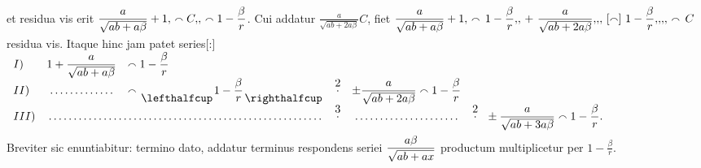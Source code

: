 \pend
\count{}
\count{}
\pstart
\noindent
et residua vis erit $\displaystyle \rule[-4mm]{0mm}{10mm} \frac{a}{\sqrt{ab + a \beta}} + 1, \, \smallfrown C,\!, \, \smallfrown 1 - \frac{\beta}{r}$.
Cui addatur $\displaystyle \frac{a}{\sqrt{ab + 2a \beta}} C$,
fiet $\displaystyle \frac{a}{\sqrt{ab + a \beta}} + 1, \, \smallfrown \, 1 - \rule[-4mm]{0mm}{10mm} \frac{\beta}{r},\!, \, + \ \frac{a}{\sqrt{ab + 2a \beta}},\!,\!, \, [\smallfrown] \ 1 - \frac{\beta}{r},\!,\!,\!, \, \smallfrown \, C$ residua vis.
Itaque hinc jam patet series[:]
$\begin{array}{llllll}
I) 
& {\displaystyle 1 + \frac{a}{\sqrt{ab + a \beta}}} 
& {\displaystyle \smallfrown 1 - \frac{\beta}{r}}
\\
II) 
& \multicolumn{1}{c}{\displaystyle \dotfill}
& {\displaystyle \smallfrown {\atop \lefthalfcup} 1 - \frac{\beta}{r} {\atop \righthalfcup}}
& \overset{\displaystyle 2}{\displaystyle \cdot}
& {\displaystyle \pm  \frac{a}{\sqrt{ab + 2a \beta}} \smallfrown 1 - \frac{\beta}{r}}
\\
III) 
& \multicolumn{2}{c}{\displaystyle \dotfill} 
& \overset{\displaystyle 3}{\displaystyle \cdot}
& \multicolumn{1}{c}{\displaystyle \dotfill} 
& {\displaystyle \overset{\displaystyle 2}{\displaystyle \cdot} \ \ \pm \frac{a}{\sqrt{ab + 3a \beta}} \smallfrown 1 - \frac{\beta}{r}.}
\\
\end{array}$
\\
\pend
\pstart
   \noindent Breviter sic enuntiabitur: termino dato, addatur terminus respondens seriei $\displaystyle \rule[-4mm]{0mm}{10mm} \frac{a \beta}{\sqrt{ab + ax}}$
productum multiplicetur per $\displaystyle 1 - \frac{\beta}{r}$.
